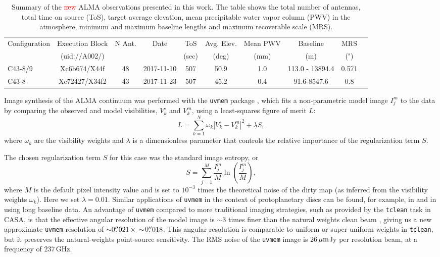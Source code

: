 \documentclass[fleqn,usenatbib,useAMS]{mnras}
\newcommand{\red}[1]{\textcolor{red}{#1}}
\begin{document}
\begin{table}
 \caption{Summary of the \red{\sout{new}} ALMA observations presented in this work. The table shows the total number of antennas, total time on  source (ToS), target average elevation, mean precipitable water vapor column (PWV) in the atmosphere, minimum and maximum baseline lengths and maximum recoverable scale (MRS).}
 \label{tab:Summary_ALMA}
 \begin{tabular}{lccccccccc}
  \hline
  Configuration & Execution Block & N Ant. & Date & ToS & Avg. Elev. & Mean PWV & Baseline & MRS \\
   & (uid://A002/) & & & (sec) & (deg) & (mm) & (m) & (")\\
  \hline
  C43-8/9  & Xc6b674/X44f & 48 & 2017-11-10 & 507 &  50.9 &  1.0  & 113.0 - 13894.4 & 0.571 \\
  C43-8  & Xc72427/X34f2 & 43 & 2017-11-23 & 507 & 45.2 & 0.4  &91.6-8547.6 & 0.8\\
  \hline
 \end{tabular}
\end{table}

Image synthesis of the ALMA continuum was performed with the {\tt uvmem} package \citep{2006ApJ...639..951C, 2018A&C....22...16C}, which fits a non-parametric model image $I^m_j$ to the data by comparing the observed and model visibilities, $V^\circ_k$ and $V^m_k$, using a least-squares figure of merit $L$:
\begin{equation}
  L = \sum_{k=1}^N \omega_k  |V^\circ_k - V^m_k|^2 + \lambda S,
\end{equation}
where $\omega_k$ are the visibility weights and $\lambda$ is a dimensionless parameter that controls the relative importance of the regularization term $S$.

The chosen regularization term $S$ for this case was the standard image entropy, or
\begin{equation}
S = \sum_{j=1}^M \frac{I_j^m}{M} \ln\left(\frac{I_j^m}{M}\right),
\end{equation}
where $M$ is the default pixel intensity value and is set to $10^{-3}$ times the theoretical noise of the dirty map (as inferred from the visibility weights $\omega_k$). Here we set $\lambda = 0.01$. Similar applications of {\tt uvmem} in the context of protoplanetary discs can be found, for example, in \citet{Casassus2013Natur, 2018MNRAS.477.5104C, Casassus2019MNRAS.483.3278C, Perez2019AJ....158...15P} and in \citet{2020ApJ...889L..24P} using long baseline data. An advantage of {\tt uvmem} compared to more traditional imaging strategies, such as provided by the {\tt tclean} task in CASA, is that the effective angular resolution of the model image is $\sim$3 times finer than the natural weights clean beam \citep[][]{2018A&C....22...16C}, giving us a new approximate {\tt uvmem} resolution of $\sim$0$\hbox{$.\!\!^{\prime\prime}$}021 \,\times \,\sim$0$\hbox{$.\!\!^{\prime\prime}$}018$. This angular resolution is comparable to uniform or super-uniform weights in {\tt tclean}, but it preserves the natural-weights point-source sensitivity. The RMS noise of the {\tt uvmem} image is 26\,$\hbox{$\mu$m}$Jy per resolution beam, at a frequency of 237\,GHz.
\end{document}
